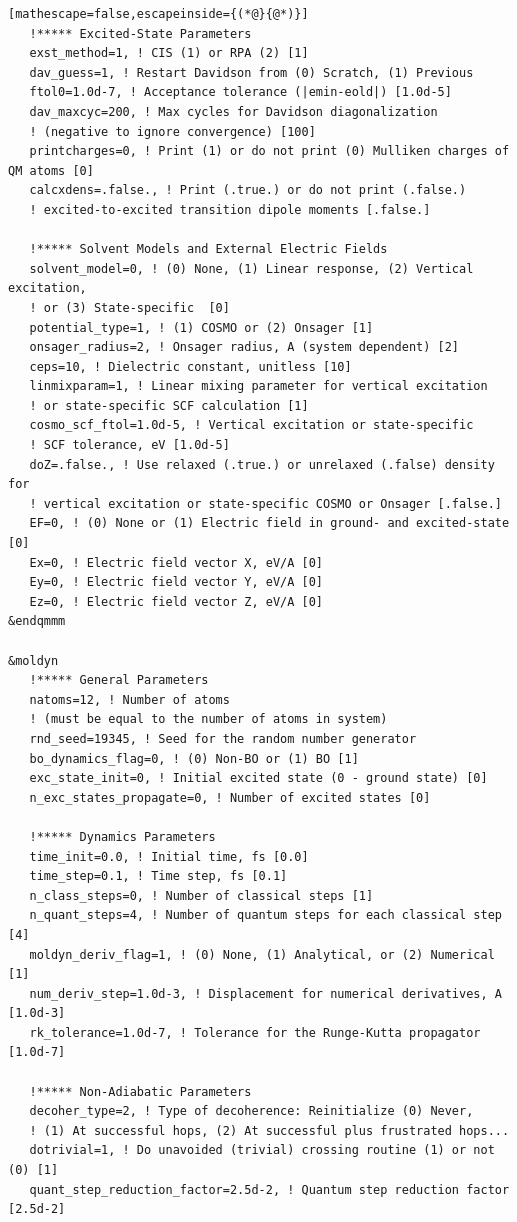 \documentclass[letterpaper,12pt,titlepage]{article}
\begin{document}
\begin{appendix}
\begin{lstlisting}[mathescape=false,escapeinside={(*@}{@*)}]
   !***** Excited-State Parameters
   exst_method=1, ! CIS (1) or RPA (2) [1]
   dav_guess=1, ! Restart Davidson from (0) Scratch, (1) Previous
   ftol0=1.0d-7, ! Acceptance tolerance (|emin-eold|) [1.0d-5]
   dav_maxcyc=200, ! Max cycles for Davidson diagonalization 
   ! (negative to ignore convergence) [100]
   printcharges=0, ! Print (1) or do not print (0) Mulliken charges of QM atoms [0]
   calcxdens=.false., ! Print (.true.) or do not print (.false.) 
   ! excited-to-excited transition dipole moments [.false.]

   !***** Solvent Models and External Electric Fields
   solvent_model=0, ! (0) None, (1) Linear response, (2) Vertical excitation, 
   ! or (3) State-specific  [0]
   potential_type=1, ! (1) COSMO or (2) Onsager [1]
   onsager_radius=2, ! Onsager radius, A (system dependent) [2]
   ceps=10, ! Dielectric constant, unitless [10]
   linmixparam=1, ! Linear mixing parameter for vertical excitation
   ! or state-specific SCF calculation [1]
   cosmo_scf_ftol=1.0d-5, ! Vertical excitation or state-specific
   ! SCF tolerance, eV [1.0d-5]
   doZ=.false., ! Use relaxed (.true.) or unrelaxed (.false) density for 
   ! vertical excitation or state-specific COSMO or Onsager [.false.]
   EF=0, ! (0) None or (1) Electric field in ground- and excited-state [0]
   Ex=0, ! Electric field vector X, eV/A [0]
   Ey=0, ! Electric field vector Y, eV/A [0]
   Ez=0, ! Electric field vector Z, eV/A [0] 
&endqmmm

&moldyn
   !***** General Parameters
   natoms=12, ! Number of atoms 
   ! (must be equal to the number of atoms in system)
   rnd_seed=19345, ! Seed for the random number generator
   bo_dynamics_flag=0, ! (0) Non-BO or (1) BO [1]
   exc_state_init=0, ! Initial excited state (0 - ground state) [0]
   n_exc_states_propagate=0, ! Number of excited states [0]

   !***** Dynamics Parameters
   time_init=0.0, ! Initial time, fs [0.0]
   time_step=0.1, ! Time step, fs [0.1]
   n_class_steps=0, ! Number of classical steps [1]
   n_quant_steps=4, ! Number of quantum steps for each classical step [4]
   moldyn_deriv_flag=1, ! (0) None, (1) Analytical, or (2) Numerical [1]
   num_deriv_step=1.0d-3, ! Displacement for numerical derivatives, A [1.0d-3]
   rk_tolerance=1.0d-7, ! Tolerance for the Runge-Kutta propagator [1.0d-7]

   !***** Non-Adiabatic Parameters
   decoher_type=2, ! Type of decoherence: Reinitialize (0) Never, 
   ! (1) At successful hops, (2) At successful plus frustrated hops... 
   dotrivial=1, ! Do unavoided (trivial) crossing routine (1) or not (0) [1]
   quant_step_reduction_factor=2.5d-2, ! Quantum step reduction factor [2.5d-2]


\end{lstlisting}
\end{appendix}
\end{document}
